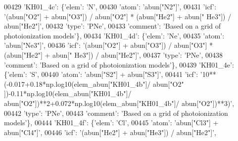 \begin{DoxyCode}
00429                          \textcolor{stringliteral}{'KH01\_4c'}: \{\textcolor{stringliteral}{'elem'}: \textcolor{stringliteral}{'N'},
00430                                      \textcolor{stringliteral}{'atom'}: \textcolor{stringliteral}{'abun["N2"]'},
00431                                      \textcolor{stringliteral}{'icf'}: \textcolor{stringliteral}{'(abun["O2"] + abun["O3"]) / abun["O2"] * (abun["He2"] + abun["
      He3"]) / abun["He2"]'},
00432                                      \textcolor{stringliteral}{'type'}: \textcolor{stringliteral}{'PNe'},
00433                                      \textcolor{stringliteral}{'comment'}: \textcolor{stringliteral}{'Based on a grid of photoionization models'}\},
00434                          \textcolor{stringliteral}{'KH01\_4d'}: \{\textcolor{stringliteral}{'elem'}: \textcolor{stringliteral}{'Ne'},
00435                                      \textcolor{stringliteral}{'atom'}: \textcolor{stringliteral}{'abun["Ne3"]'},
00436                                      \textcolor{stringliteral}{'icf'}: \textcolor{stringliteral}{'(abun["O2"] + abun["O3"]) / abun["O3"] * (abun["He2"] + abun["
      He3"]) / abun["He2"]'},
00437                                      \textcolor{stringliteral}{'type'}: \textcolor{stringliteral}{'PNe'},
00438                                      \textcolor{stringliteral}{'comment'}: \textcolor{stringliteral}{'Based on a grid of photoionization models'}\},
00439                          \textcolor{stringliteral}{'KH01\_4e'}: \{\textcolor{stringliteral}{'elem'}: \textcolor{stringliteral}{'S'},
00440                                      \textcolor{stringliteral}{'atom'}: \textcolor{stringliteral}{'abun["S2"] + abun["S3"]'},
00441                                      \textcolor{stringliteral}{'icf'}: \textcolor{stringliteral}{'10**(-0.017+0.18*np.log10(elem\_abun["KH01\_4b"]/ abun["O2"
      ])-0.11*np.log10(elem\_abun["KH01\_4b"]/ abun["O2"])**2+0.072*np.log10(elem\_abun["KH01\_4b"]/ abun["O2"])**3)'},
00442                                      \textcolor{stringliteral}{'type'}: \textcolor{stringliteral}{'PNe'},
00443                                      \textcolor{stringliteral}{'comment'}: \textcolor{stringliteral}{'Based on a grid of photoionization models'}\},
00444                          \textcolor{stringliteral}{'KH01\_4f'}: \{\textcolor{stringliteral}{'elem'}: \textcolor{stringliteral}{'Cl'},
00445                                      \textcolor{stringliteral}{'atom'}: \textcolor{stringliteral}{'abun["Cl3"] + abun["Cl4"]'},
00446                                      \textcolor{stringliteral}{'icf'}: \textcolor{stringliteral}{'(abun["He2"] + abun["He3"]) / abun["He2"]'},

\end{DoxyCode}

